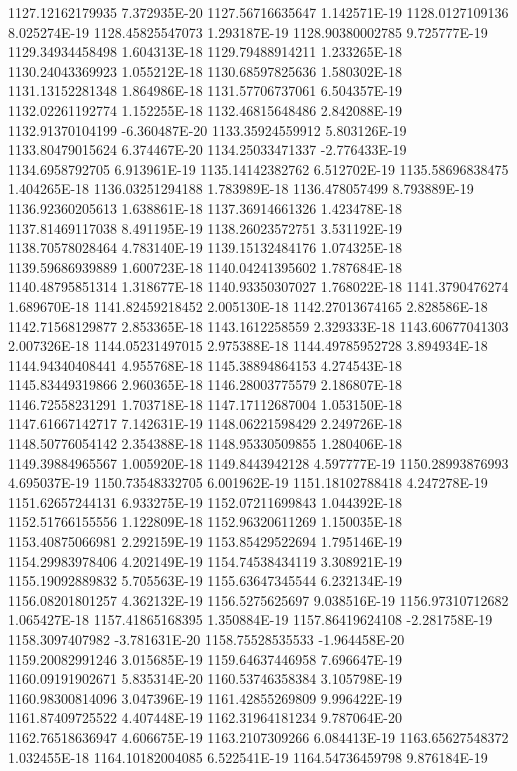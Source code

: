 1127.12162179935  7.372935E-20
1127.56716635647  1.142571E-19
1128.0127109136  8.025274E-19
1128.45825547073  1.293187E-19
1128.90380002785  9.725777E-19
1129.34934458498  1.604313E-18
1129.79488914211  1.233265E-18
1130.24043369923  1.055212E-18
1130.68597825636  1.580302E-18
1131.13152281348  1.864986E-18
1131.57706737061  6.504357E-19
1132.02261192774  1.152255E-18
1132.46815648486  2.842088E-19
1132.91370104199  -6.360487E-20
1133.35924559912  5.803126E-19
1133.80479015624  6.374467E-20
1134.25033471337  -2.776433E-19
1134.6958792705  6.913961E-19
1135.14142382762  6.512702E-19
1135.58696838475  1.404265E-18
1136.03251294188  1.783989E-18
1136.478057499  8.793889E-19
1136.92360205613  1.638861E-18
1137.36914661326  1.423478E-18
1137.81469117038  8.491195E-19
1138.26023572751  3.531192E-19
1138.70578028464  4.783140E-19
1139.15132484176  1.074325E-18
1139.59686939889  1.600723E-18
1140.04241395602  1.787684E-18
1140.48795851314  1.318677E-18
1140.93350307027  1.768022E-18
1141.3790476274  1.689670E-18
1141.82459218452  2.005130E-18
1142.27013674165  2.828586E-18
1142.71568129877  2.853365E-18
1143.1612258559  2.329333E-18
1143.60677041303  2.007326E-18
1144.05231497015  2.975388E-18
1144.49785952728  3.894934E-18
1144.94340408441  4.955768E-18
1145.38894864153  4.274543E-18
1145.83449319866  2.960365E-18
1146.28003775579  2.186807E-18
1146.72558231291  1.703718E-18
1147.17112687004  1.053150E-18
1147.61667142717  7.142631E-19
1148.06221598429  2.249726E-18
1148.50776054142  2.354388E-18
1148.95330509855  1.280406E-18
1149.39884965567  1.005920E-18
1149.8443942128  4.597777E-19
1150.28993876993  4.695037E-19
1150.73548332705  6.001962E-19
1151.18102788418  4.247278E-19
1151.62657244131  6.933275E-19
1152.07211699843  1.044392E-18
1152.51766155556  1.122809E-18
1152.96320611269  1.150035E-18
1153.40875066981  2.292159E-19
1153.85429522694  1.795146E-19
1154.29983978406  4.202149E-19
1154.74538434119  3.308921E-19
1155.19092889832  5.705563E-19
1155.63647345544  6.232134E-19
1156.08201801257  4.362132E-19
1156.5275625697  9.038516E-19
1156.97310712682  1.065427E-18
1157.41865168395  1.350884E-19
1157.86419624108  -2.281758E-19
1158.3097407982  -3.781631E-20
1158.75528535533  -1.964458E-20
1159.20082991246  3.015685E-19
1159.64637446958  7.696647E-19
1160.09191902671  5.835314E-20
1160.53746358384  3.105798E-19
1160.98300814096  3.047396E-19
1161.42855269809  9.996422E-19
1161.87409725522  4.407448E-19
1162.31964181234  9.787064E-20
1162.76518636947  4.606675E-19
1163.2107309266  6.084413E-19
1163.65627548372  1.032455E-18
1164.10182004085  6.522541E-19
1164.54736459798  9.876184E-19

